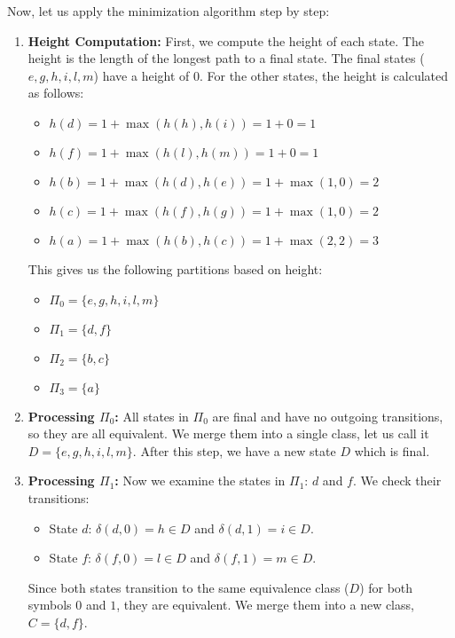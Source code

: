 \begin{example}
    Now, let us apply the minimization algorithm step by step:
    \begin{enumerate}
        \item \textbf{Height Computation:} First, we compute the height of each state. The height is the length of the longest path to a final state. The final states ($e, g, h, i, l, m$) have a height of 0. For the other states, the height is calculated as follows:
        \begin{itemize}
            \item $h(d) = 1 + \max(h(h), h(i)) = 1 + 0 = 1$
            \item $h(f) = 1 + \max(h(l), h(m)) = 1 + 0 = 1$
            \item $h(b) = 1 + \max(h(d), h(e)) = 1 + \max(1, 0) = 2$
            \item $h(c) = 1 + \max(h(f), h(g)) = 1 + \max(1, 0) = 2$
            \item $h(a) = 1 + \max(h(b), h(c)) = 1 + \max(2, 2) = 3$
        \end{itemize}
        This gives us the following partitions based on height:
        \begin{itemize}
            \item $\Pi_0 = \{e, g, h, i, l, m\}$
            \item $\Pi_1 = \{d, f\}$
            \item $\Pi_2 = \{b, c\}$
            \item $\Pi_3 = \{a\}$
        \end{itemize}

        \item \textbf{Processing $\Pi_0$:} All states in $\Pi_0$ are final and have no outgoing transitions, so they are all equivalent. We merge them into a single class, let us call it $D = \{e, g, h, i, l, m\}$. After this step, we have a new state $D$ which is final.

        \item \textbf{Processing $\Pi_1$:} Now we examine the states in $\Pi_1$: $d$ and $f$. We check their transitions:
        \begin{itemize}
            \item State $d$: $\delta(d, 0) = h \in D$ and $\delta(d, 1) = i \in D$.
            \item State $f$: $\delta(f, 0) = l \in D$ and $\delta(f, 1) = m \in D$.
        \end{itemize}
        Since both states transition to the same equivalence class ($D$) for both symbols $0$ and $1$, they are equivalent. We merge them into a new class, $C = \{d, f\}$.


\end{enumerate}
\end{example}
